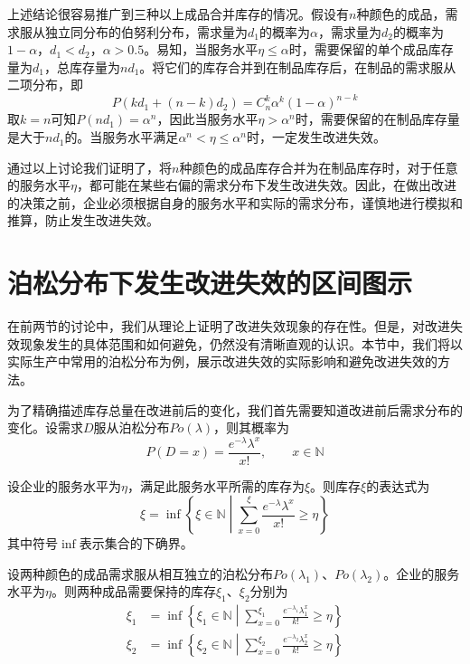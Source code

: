 上述结论很容易推广到三种以上成品合并库存的情况。假设有$n$种颜色的成品，需求服从独立同分布的伯努利分布，需求量为$d_1$的概率为$\alpha$，需求量为$d_2$的概率为$1-\alpha$，$d_1 < d_2$，$\alpha > 0.5$。易知，当服务水平$\eta \leq \alpha$时，需要保留的单个成品库存量为$d_1$，总库存量为$nd_1$。将它们的库存合并到在制品库存后，在制品的需求服从二项分布，即
\[
P(kd_1+(n-k)d_2) = C_{n}^{k}\alpha^k(1-\alpha)^{n-k}
\]
取$k=n$可知$P(nd_1)=\alpha^n$，因此当服务水平$\eta > \alpha^n$时，需要保留的在制品库存量是大于$nd_1$的。当服务水平满足$\alpha^n < \eta \leq \alpha^n$时，一定发生改进失效。

通过以上讨论我们证明了，将$n$种颜色的成品库存合并为在制品库存时，对于任意的服务水平$\eta$，都可能在某些右偏的需求分布下发生改进失效。因此，在做出改进的决策之前，企业必须根据自身的服务水平和实际的需求分布，谨慎地进行模拟和推算，防止发生改进失效。








\section{泊松分布下发生改进失效的区间图示}

在前两节的讨论中，我们从理论上证明了改进失效现象的存在性。但是，对改进失效现象发生的具体范围和如何避免，仍然没有清晰直观的认识。本节中，我们将以实际生产中常用的泊松分布为例，展示改进失效的实际影响和避免改进失效的方法。

为了精确描述库存总量在改进前后的变化，我们首先需要知道改进前后需求分布的变化。设需求$D$服从泊松分布$Po(\lambda)$，则其概率为
\[
P(D=x) = \frac{e^{-\lambda}\lambda^x}{x!},\qquad x\in\mathbb{N}
\]

设企业的服务水平为$\eta$，满足此服务水平所需的库存为$\xi$。则库存$\xi$的表达式为
\begin{equation}
\xi = \inf\left\{\xi\in\mathbb{N}\middle|\sum_{x=0}^{\xi}\frac{e^{-\lambda}\lambda^x}{x!}\geq \eta\right\}
\end{equation}
其中符号$\inf$表示集合的下确界。

设两种颜色的成品需求服从相互独立的泊松分布$Po(\lambda_1)$、$Po(\lambda_2)$。企业的服务水平为$\eta$。则两种成品需要保持的库存$\xi_1$、$\xi_2$分别为
\begin{align}
\xi_1 &= \inf\left\{\xi_1\in\mathbb{N}\middle|\sum_{x=0}^{\xi_1}\frac{e^{-\lambda_1}\lambda_1^x}{k!}\geq \eta\right\} \label{eq:成品库存_泊松1}\\
\xi_2 &= \inf\left\{\xi_2\in\mathbb{N}\middle|\sum_{x=0}^{\xi_2}\frac{e^{-\lambda_2}\lambda_2^x}{k!}\geq \eta\right\} \label{eq:成品库存_泊松2}
\end{align}

